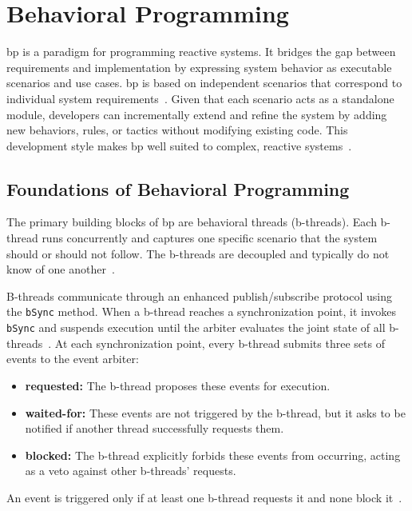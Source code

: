 \section{Behavioral Programming}
\label{sec:bg_bp}

\gls{bp} is a paradigm for programming reactive systems.
It bridges the gap between requirements and implementation by expressing system behavior as executable scenarios and use cases.
\gls{bp} is based on independent scenarios that correspond to individual system requirements~\cite{harel_behavioral_2012}.
Given that each scenario acts as a standalone module, developers can incrementally extend and refine the system by adding new behaviors, rules, or tactics without modifying existing code.
This development style makes \gls{bp} well suited to complex, reactive systems~\cite{elyasaf_context-oriented_2021}.

\subsection{Foundations of Behavioral Programming}
\label{subsec:bg_bp_foundation}

The primary building blocks of \gls{bp} are behavioral threads (b-threads).
Each b-thread runs concurrently and captures one specific scenario that the system should or should not follow.
The b-threads are decoupled and typically do not know of one another~\cite{harel_behavioral_2012}.

B-threads communicate through an enhanced publish/subscribe protocol using the \texttt{bSync} method.
When a b-thread reaches a synchronization point, it invokes \texttt{bSync} and suspends execution until the arbiter evaluates the joint state of all b-threads~\cite{harel_behavioral_2012}.
At each synchronization point, every b-thread submits three sets of events to the event arbiter:
\begin{itemize}
\item \textbf{requested:} The b-thread proposes these events for execution.
\item \textbf{waited-for:} These events are not triggered by the b-thread, but it asks to be notified if another thread successfully requests them.
\item \textbf{blocked:} The b-thread explicitly forbids these events from occurring, acting as a veto against other b-threads' requests.
\end{itemize}
An event is triggered only if at least one b-thread requests it and none block it~\cite{elyasaf_context-oriented_2021}.

